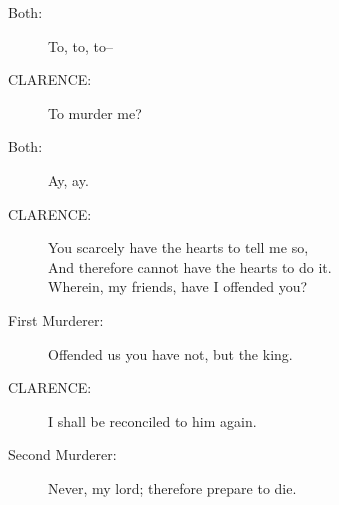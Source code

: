 \documentclass{article}
\begin{document}
\begin{description}
\item[Both:] 
\hspace{1pt}To, to, to--\\
\end{description}
\begin{description}
\item[CLARENCE:] 
\hspace{1pt}To murder me?\\
\end{description}
\begin{description}
\item[Both:] 
\hspace{1pt}Ay, ay.\\
\end{description}
\begin{description}
\item[CLARENCE:] 
\hspace{1pt}You scarcely have the hearts to tell me so,\\
\hspace{1pt}And therefore cannot have the hearts to do it.\\
\hspace{1pt}Wherein, my friends, have I offended you?\\
\end{description}
\begin{description}
\item[First Murderer:] 
\hspace{1pt}Offended us you have not, but the king.\\
\end{description}
\begin{description}
\item[CLARENCE:] 
\hspace{1pt}I shall be reconciled to him again.\\
\end{description}
\begin{description}
\item[Second Murderer:] 
\hspace{1pt}Never, my lord; therefore prepare to die.\\
\end{description}
\end{document}

